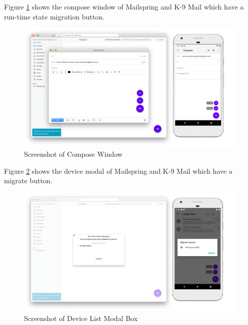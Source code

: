 Figure \ref{fig:adapt-compose} shows the compose window of Mailspring and K-9 Mail which have a run-time state migration button.

\FloatBarrier
\begin{figure}[H]
    \includegraphics[width=\linewidth]{../figures/adapt-compose.png}
    \centering
    \caption{Screenshot of Compose Window}
    \label{fig:adapt-compose}
\end{figure}
\FloatBarrier

Figure \ref{fig:adapt-modal} shows the device modal of Mailspring and K-9 Mail which have a migrate button.

\FloatBarrier
\begin{figure}[H]
    \includegraphics[width=\linewidth]{../figures/adapt-modal.png}
    \centering
    \caption{Screenshot of Device List Modal Box}
    \label{fig:adapt-modal}
\end{figure}
\FloatBarrier


